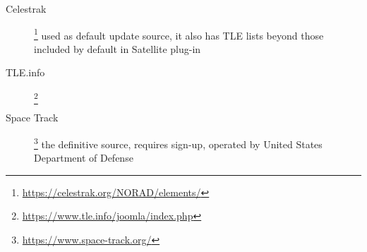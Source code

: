 \begin{description}
\item[Celestrak]\footnote{\url{https://celestrak.org/NORAD/elements/}} used as default update source, it also has TLE lists
  beyond those included by default in Satellite plug-in
\item[TLE.info]\footnote{\url{https://www.tle.info/joomla/index.php}}
\item[Space Track]\footnote{\url{https://www.space-track.org/}} the definitive source, requires sign-up, operated by
  United States Department of Defense
\end{description}

%
%
%


